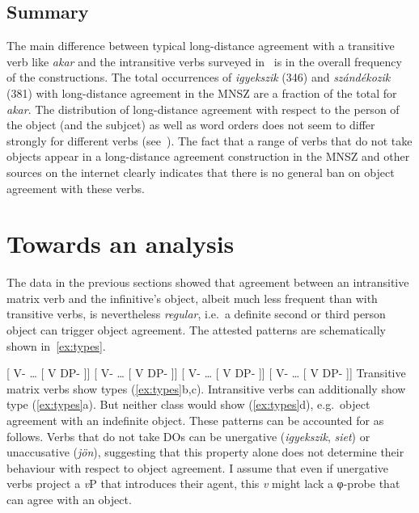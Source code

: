 \subsection{Summary}\label{sub:summary}

The main difference between typical long-distance agreement with a transitive
verb like \emph{akar} and the intransitive verbs surveyed in~ is
in the overall frequency of the constructions. The total occurrences of
\emph{igyekszik} (346) and \emph{szándékozik} (381) with long-distance
agreement in the \gls{MNSZ} are a fraction of the total for \emph{akar}. The
distribution of long-distance agreement with respect to the person of the
object (and the subjcet) as well as word orders does not seem to differ
strongly for different verbs
(see~).
%
The fact that a range of verbs that do not take \Acc{} objects appear in a
long-distance agreement construction in the \gls{MNSZ} and other sources on the
internet clearly indicates that there is no general ban on object agreement
with these verbs.

\section{Towards an analysis}\label{sec:analysis}

The data in the previous sections showed that agreement between an intransitive
matrix verb and the infinitive's object, albeit much less frequent than with
transitive verbs, is nevertheless \emph{regular}, i.e.\ a definite second or
third person object can trigger object agreement. The attested patterns are
schematically shown in~\eqref{ex:types}.

\pex\label{ex:types} \a 	{}[ V-\Sbj{} \dots{} [\tss{\Inf} V DP-\Def{}
]]\trailingcitation{\faCheck} \a 	{}[ V-\Obj{} \dots{} [\tss{\Inf} V
DP-\Def{} ]]\trailingcitation{\faCheck} \a 	{}[ V-\Sbj{} \dots{} [\tss{\Inf} V
DP-\Indef{} ]]\trailingcitation{\faCheck} \a 	{}[ V-\Obj{} \dots{}
[\tss{\Inf} V DP-\Indef{} ]]\trailingcitation{\faTimes} \xe Transitive matrix
verbs show types (\ref{ex:types}b,c). Intransitive verbs can additionally show
type (\ref{ex:types}a). But neither class would show (\ref{ex:types}d), e.g.\
object agreement with an indefinite object.
%
These patterns can be accounted for as follows. Verbs that do not take \Acc{}
\glspl{DO} can be unergative (\emph{igyekszik}, \emph{siet}) or unaccusative
(\emph{jön}), suggesting that this property alone does not determine their
behaviour with respect to object agreement. I assume that even if unergative
verbs project a \emph{v}P that introduces their agent, this \emph{v} might lack
a φ-probe that can agree with an \Acc{} object.

